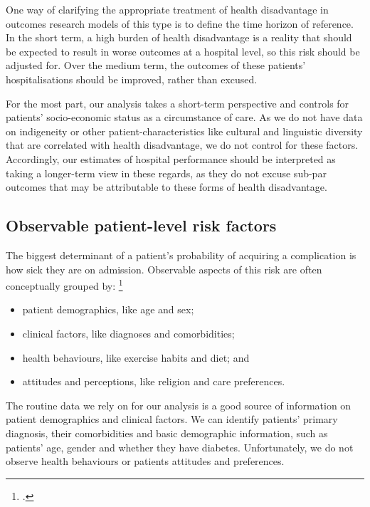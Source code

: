 \documentclass[submission]{grattan}
\begin{document}
One way of clarifying the appropriate treatment of health disadvantage in outcomes research models of this type is to define the time horizon of reference.
In the short term, a high burden of health disadvantage is a reality that should be expected to result in worse outcomes at a hospital level, so this risk should be adjusted for.
Over the medium term, the outcomes of these patients' hospitalisations should be improved, rather than excused.

For the most part, our analysis takes a short-term perspective and controls for patients' socio-economic status as a circumstance of care.
As we do not have data on indigeneity or other patient-characteristics like cultural and linguistic diversity that are correlated with health disadvantage, we do not control for these factors.
Accordingly, our estimates of hospital performance should be interpreted as taking a longer-term view in these regards, as they do not excuse sub-par outcomes that may be attributable to these forms of health disadvantage.

\subsection{Observable patient-level risk factors}\label{subsec:observable-patient-level-risk-factors}

The biggest determinant of a patient's probability of acquiring a complication is how sick they are on admission.
Observable aspects of this risk are often conceptually grouped by:%
	\footcite{Iezzoni-2012-Risk-Adjustment-for-Measuring-Health-Care-Outcomes}

\begin{itemize}
\item
  patient demographics, like age and sex;
\item
  clinical factors, like diagnoses and comorbidities;
\item
  health behaviours, like exercise habits and diet; and
\item
  attitudes and perceptions, like religion and care preferences.
\end{itemize}

The routine data we rely on for our analysis is a good source of information on patient demographics and clinical factors.
We can
identify patients' primary diagnosis, their comorbidities and basic demographic information, such as patients' age, gender and whether they have diabetes.
Unfortunately, we do not observe health behaviours or patients attitudes and preferences.
\end{document}
